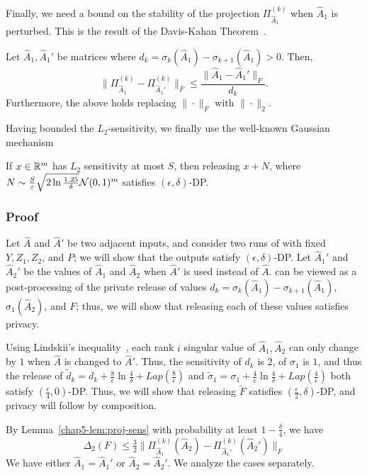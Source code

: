Finally, we need a bound on the stability of the projection $\Pi_{\hat{A}_1}^{(k)}$ when $\hat{A}_1$ is perturbed. This is the result of the Davis-Kahan Theorem~\citep{bhatia1997}.
\begin{thm}\label{chap5-thm:davis-kahan}
Let $\hat{A}_1, \hat{A}_1'$ be matrices where $d_k= \sigma_k(\hat{A}_1) - \sigma_{k+1}(\hat{A}_1) > 0$. Then, 
\[
    \|\Pi_{\hat{A}_1}^{(k)} - \Pi_{\hat{A}_1'}^{(k)}\|_F \leq \frac{\|\hat{A}_1 - \hat{A}_1'\|_F}{d_k}.
\]
Furthermore, the above holds replacing $\|\cdot\|_F$ with $\|\cdot \|_2$.
\end{thm}

Having bounded the $L_2$-sensitivity, we finally use the well-known Gaussian mechanism~\citep{DP}
\begin{thm}\label{chap5-thm:gauss-mech}
    If $x \in \mathbb{R}^m$ has $L_2$ sensitivity at most $S$, then releasing $x + N$, where $N \sim \frac{S}{\varepsilon} \sqrt{2 \ln \frac{1.25}{\delta}}\mathcal{N}(0,1)^{m}$ satisfies $(\epsilon, \delta)$-DP.
\end{thm}

\subsubsection{Proof}
Let $\hat{A}$ and $\hat{A}'$ be two adjacent inputs, and consider two runs of \dpcom{} with fixed $Y,Z_1,Z_2$, and $P$; we will show that the outputs satisfy $(\epsilon, \delta)$-DP. Let $\hat{A}_1'$ and $\hat{A}_2'$ be the values of $\hat{A}_1$ and $\hat{A}_2$ when $\hat{A}'$ is used instead of $\hat{A}$. \dpcom{} can be viewed as a post-processing of the private release of values $d_k = \sigma_k(\hat{A}_1) - \sigma_{k+1}(\hat{A}_1)$, $\sigma_1(\hat{A}_2)$, and $F$; thus, we will show that releasing each of these values satisfies privacy.

Using Lindskii's inequality~\citep{bhatia1997}, each rank $i$ singular value of $\hat{A}_1, \hat{A}_2$ can only change by $1$ when $\hat{A}$ is changed to $\hat{A}'$. Thus, the sensitivity of $d_k$ is $2$, of $\sigma_1$ is $1$, and thus the release of $\tilde{d}_k = d_k + \frac{8}{\epsilon} \ln \frac{4}{\delta} + Lap(\frac{8}{\epsilon})$ and $\tilde{\sigma}_1 = \sigma_1 + \frac{4}{\epsilon} \ln \frac{4}{\delta} + Lap(\frac{4}{\epsilon})$ both satisfy $(\frac{\epsilon}{4}, 0)$-DP. Thus, we will show that releasing $\tilde{F}$ satisfies $(\frac \epsilon 2, \delta)$-DP, and privacy will follow by composition.

By Lemma~\ref{chap5-lem:proj-sens} with probability at least $1-\frac{\delta}{4}$, we have
\[
    \Delta_2(F) \leq \tfrac 3 2 \|\Pi_{\hat{A}_1}^{(k)}(\hat{A}_2) - \Pi_{\hat{A}_1'}^{(k)}(\hat{A}_2')\|_F
\]
We have either $\hat{A}_1 = \hat{A}_1'$ or $\hat{A}_2 = \hat{A}_2'$. We analyze the cases separately.

